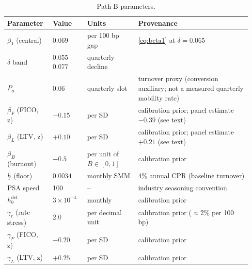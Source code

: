 \documentclass[12pt]{article}
\begin{document}
\begin{table}[H]
\centering
\footnotesize
\setlength{\tabcolsep}{4pt}
\begin{threeparttable}
\caption{Path B parameters.}
\label{tab:params}
\begin{tabular}{@{}llp{3.2cm}p{6.6cm}@{}}
\toprule
Parameter & Value & Units & Provenance \\
\midrule
$\beta_1$ (central) & $0.069$ & per 100 bp gap & \eqref{eq:beta1} at $\delta = 0.065$ \citep{liebersohn2024} \\
$\delta$ band & $0.055$--$0.077$ & quarterly decline & \citet{liebersohn2024} \\
$P_q$ & $0.06$ & quarterly slot & turnover proxy (conversion auxiliary; not a measured quarterly mobility rate) \\
$\beta_F$ (FICO, z) & $-0.15$ & per SD & calibration prior; panel estimate $-0.39$ (see text) \\
$\beta_L$ (LTV, z) & $+0.10$ & per SD & calibration prior; panel estimate $+0.21$ (see text) \\
$\beta_B$ (burnout) & $-0.5$ & per unit of $B \in [0,1]$ & calibration prior \\
$\underline{h}$ (floor) & $0.0034$ & monthly SMM & 4\% annual CPR (baseline turnover) \\
PSA speed & 100 & -- & industry seasoning convention \\
$h^{\mathrm{def}}_0$ & $3\times10^{-4}$ & monthly & calibration prior \\
$\gamma_r$ (rate stress) & $2.0$ & per decimal unit & calibration prior ($\approx$2\% per 100 bp) \\
$\gamma_F$ (FICO, z) & $-0.20$ & per SD & calibration prior \\
$\gamma_L$ (LTV, z) & $+0.25$ & per SD & calibration prior \\
\bottomrule
\end{tabular}
\end{threeparttable}
\end{table}
\end{document}
